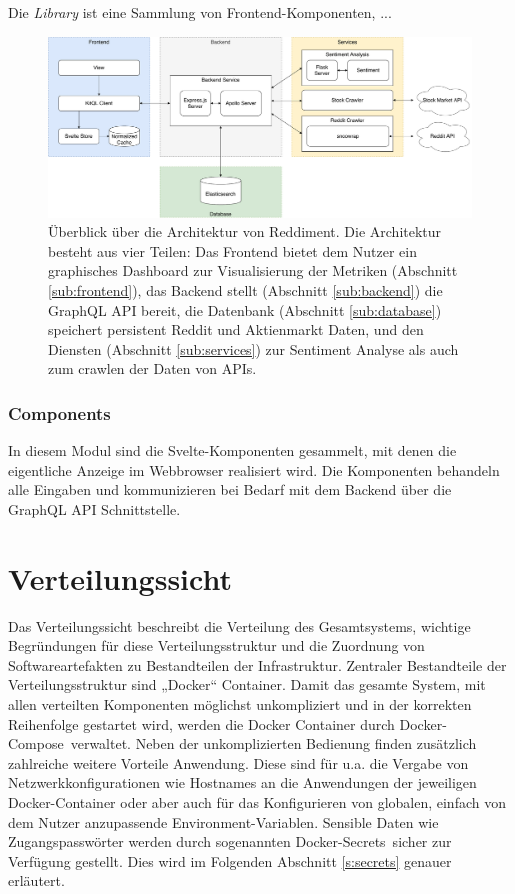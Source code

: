 \documentclass[a4paper, 10pt, conference]{IEEEtran}
\begin{document}
Die \textit{Library} ist eine Sammlung von Frontend-Komponenten,  ...

\begin{figure}[ht]
	\centering
	\includegraphics[width=\linewidth]{architecture}
	\caption{Überblick über die Architektur von Reddiment. Die Architektur besteht aus vier Teilen: Das Frontend bietet dem Nutzer ein graphisches Dashboard zur Visualisierung der Metriken (Abschnitt \ref{sub:frontend}),  das Backend stellt (Abschnitt \ref{sub:backend}) die GraphQL API bereit,  die Datenbank (Abschnitt \ref{sub:database}) speichert persistent Reddit und Aktienmarkt Daten,  und den Diensten (Abschnitt \ref{sub:services}) zur Sentiment Analyse als auch zum crawlen der Daten von APIs.}
	\label{fig:architecture}
\end{figure}

\subsubsection{Components}

In diesem Modul sind die Svelte-Komponenten gesammelt, mit denen die eigentliche Anzeige im Webbrowser realisiert wird.
Die Komponenten behandeln alle Eingaben und kommunizieren bei Bedarf mit dem Backend über die GraphQL API Schnittstelle.



\section{Verteilungssicht} \label{s:verteilungssicht}
Das Verteilungssicht beschreibt die Verteilung des Gesamtsystems, wichtige Begründungen für diese Verteilungsstruktur und die Zuordnung von Softwareartefakten zu Bestandteilen der Infrastruktur.
Zentraler Bestandteile der Verteilungsstruktur sind „Docker“ \cite{docker} Container.
Damit das gesamte System, mit allen verteilten Komponenten möglichst unkompliziert und in der korrekten Reihenfolge gestartet wird, werden die Docker Container durch \glqq Docker-Compose\grqq \ verwaltet. Neben der unkomplizierten Bedienung finden zusätzlich zahlreiche weitere Vorteile Anwendung.
Diese sind für u.a. die Vergabe von Netzwerkkonfigurationen wie Hostnames an die Anwendungen der jeweiligen Docker-Container oder aber auch für das Konfigurieren von globalen, einfach von dem Nutzer anzupassende Environment-Variablen. Sensible Daten wie Zugangspasswörter werden durch sogenannten \glqq Docker-Secrets\grqq \ sicher zur Verfügung gestellt.
Dies wird im Folgenden Abschnitt \ref{s:secrets} genauer erläutert.
\end{document}
